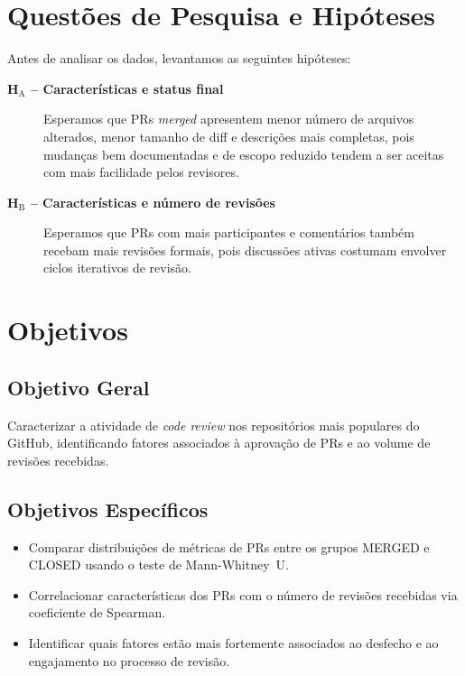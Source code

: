 \documentclass[10pt,a4paper,twocolumn]{article}
\begin{document}
\section{Questões de Pesquisa e Hipóteses}

Antes de analisar os dados, levantamos as seguintes hipóteses:

\begin{description}
  \item[\textbf{H$_{\text{A}}$ -- Características e status final}]
    Esperamos que PRs \textit{merged} apresentem menor número de arquivos
    alterados, menor tamanho de diff e descrições mais completas, pois
    mudanças bem documentadas e de escopo reduzido tendem a ser aceitas com
    mais facilidade pelos revisores.

  \item[\textbf{H$_{\text{B}}$ -- Características e número de revisões}]
    Esperamos que PRs com mais participantes e comentários também recebam
    mais revisões formais, pois discussões ativas costumam envolver ciclos
    iterativos de revisão.
\end{description}

\section{Objetivos}

\subsection{Objetivo Geral}

Caracterizar a atividade de \textit{code review} nos repositórios mais
populares do GitHub, identificando fatores associados à aprovação de PRs e
ao volume de revisões recebidas.

\subsection{Objetivos Específicos}

\begin{itemize}
  \item Comparar distribuições de métricas de PRs entre os grupos MERGED e
    CLOSED usando o teste de Mann-Whitney~U.
  \item Correlacionar características dos PRs com o número de revisões
    recebidas via coeficiente de Spearman.
  \item Identificar quais fatores estão mais fortemente associados ao
    desfecho e ao engajamento no processo de revisão.
\end{itemize}
\end{document}
